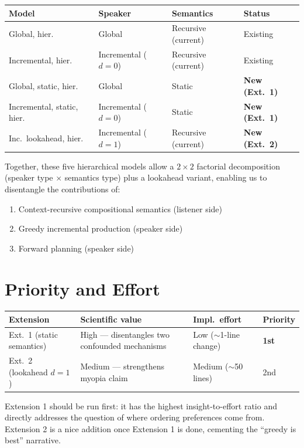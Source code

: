 \documentclass[11pt, a4paper]{article}
\begin{document}
\begin{center}
\begin{tabular}{llll}
\toprule
\textbf{Model} & \textbf{Speaker} & \textbf{Semantics} & \textbf{Status} \\
\midrule
Global, hier.              & Global       & Recursive (current) & Existing \\
Incremental, hier.         & Incremental ($d=0$) & Recursive (current) & Existing \\
\midrule
Global, static, hier.      & Global       & Static              & \textbf{New (Ext.\ 1)} \\
Incremental, static, hier. & Incremental ($d=0$) & Static              & \textbf{New (Ext.\ 1)} \\
\midrule
Inc.\ lookahead, hier.     & Incremental ($d=1$) & Recursive (current) & \textbf{New (Ext.\ 2)} \\
\bottomrule
\end{tabular}
\end{center}

Together, these five hierarchical models allow a $2 \times 2$ factorial decomposition (speaker type $\times$ semantics type) plus a lookahead variant, enabling us to disentangle the contributions of:
\begin{enumerate}
  \item Context-recursive compositional semantics (listener side)
  \item Greedy incremental production (speaker side)
  \item Forward planning (speaker side)
\end{enumerate}

\section{Priority and Effort}

\begin{center}
\begin{tabular}{llll}
\toprule
\textbf{Extension} & \textbf{Scientific value} & \textbf{Impl.\ effort} & \textbf{Priority} \\
\midrule
Ext.\ 1 (static semantics) & High --- disentangles two confounded mechanisms & Low ($\sim$1-line change) & \textbf{1st} \\
Ext.\ 2 (lookahead $d=1$)  & Medium --- strengthens myopia claim & Medium ($\sim$50 lines) & 2nd \\
\bottomrule
\end{tabular}
\end{center}

Extension 1 should be run first: it has the highest insight-to-effort ratio and directly addresses the question of where ordering preferences come from.
Extension 2 is a nice addition once Extension 1 is done, cementing the ``greedy is best'' narrative.
\end{document}
